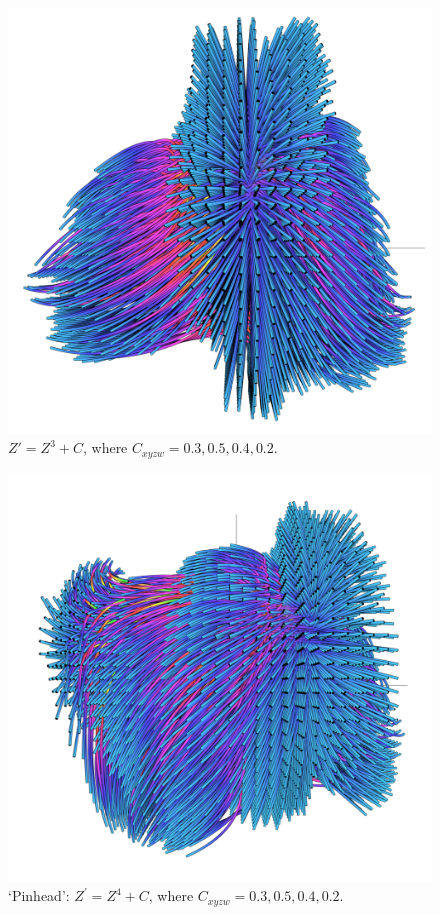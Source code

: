 \documentclass[12pt]{article}
\begin{document}
\begin{figure} 
  \includegraphics[width=\textwidth]{2.png}	
  \caption{$Z' = Z^3 + C$, where $C_{xyzw} = 0.3, 0.5, 0.4, 0.2$.}
\end{figure}

\begin{figure} 
  \includegraphics[width=\textwidth]{3.png}	
  \caption{`Pinhead': $Z^{\prime} = Z^4 + C$, where $C_{xyzw} = 0.3, 0.5, 0.4, 0.2$.}
\end{figure}
\end{document}

